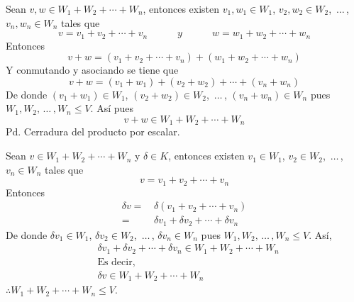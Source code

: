 \documentclass[fleqn]{article}
\begin{document}
\begin{enumerate}
\begin{enumerate}
            Sean $ v, w \in W_1 + W_2 + \cdots + W_n $, entonces existen $ v_1, w_1 \in W_1 $, $ v_2, w_2 \in W_2 $, $ \, \ldots \, $, $ v_n, w_n \in W_n $ tales que
            \begin{equation*}
                v = v_1 + v_2 + \cdots + v_n \quad \quad \quad y \quad \quad \quad
                w = w_1 + w_2 + \cdots + w_n
            \end{equation*}
            Entonces
            \begin{equation*}
                v + w = \left( v_1 + v_2 + \cdots + v_n \right) + \left( w_1 + w_2 + \cdots + w_n \right)
            \end{equation*}
            Y conmutando y asociando se tiene que 
            \begin{equation*}
                v + w = \left( v_1 + w_1 \right) + \left( v_2 + w_2 \right) + \cdots + \left( v_n + w_n \right)
            \end{equation*}
            De donde $ \left( v_1 + w_1 \right) \in W_1 $, $ \left( v_2 + w_2 \right) \in W_2 $, $ \, \ldots \, $, $ \left( v_n + w_n \right) \in W_n $ pues $ W_1, W_2, \, \ldots \, , W_n \leq V $. Así pues
            \begin{equation*}
                v + w \in W_1 + W_2 + \cdots + W_n
            \end{equation*}
            Pd. Cerradura del producto por escalar. \par
            Sean $ v \in W_1 + W_2 + \cdots + W_n $ y $ \delta \in K $, entonces existen $ v_1 \in W_1 $, $ v_2 \in W_2 $, $ \, \ldots \, $, $ v_n \in W_n $ tales que
            \begin{equation*}
                v = v_1 + v_2 + \cdots + v_n
            \end{equation*}
            Entonces
            \begin{align*}
                \delta v =& \, \delta \left( v_1 + v_2 + \cdots + v_n \right) \\
                =& \, \delta v_1 + \delta v_2 + \cdots + \delta v_n 
            \end{align*}
            De donde $ \delta v_1 \in W_1 $, $ \delta v_2 \in W_2 $, $ \, \ldots \, $, $ \delta v_n \in W_n $ pues $ W_1, W_2, \, \ldots \, , W_n \leq V $. Así,
            \begin{align*}
                & \delta v_1 + \delta v_2 + \cdots + \delta v_n \in W_1 + W_2 + \cdots + W_n \\
                & \text{Es decir,} \\
                & \delta v \in W_1 + W_2 + \cdots + W_n
            \end{align*}
            $ \therefore W_1 + W_2 + \cdots + W_n \leq V $.


\end{enumerate}
\end{enumerate}
\end{document}
